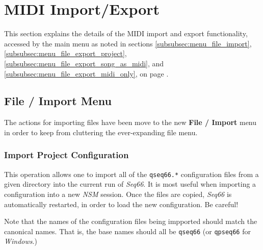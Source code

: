 %
%
%

\section{MIDI Import/Export}
\label{sec:midi_import_export}

   This section explains the details of the MIDI import and export
   functionality, accessed by the main menu as noted in sections
   \ref{subsubsec:menu_file_import},
   \ref{subsubsec:menu_file_export_project},
   \ref{subsubsec:menu_file_export_song_as_midi}, and
   \ref{subsubsec:menu_file_export_midi_only}, on page
   \pageref{subsubsec:menu_file_import}.

\subsection{File / Import Menu}
\label{subsec:midi_export_file_import_menu}

   The actions for importing files have been move to the new
   \textbf{File / Import} menu in order to keep from cluttering the
   ever-expanding file menu.

\subsubsection{Import Project Configuration}
\label{subsubsec:midi_export_file_import_project}

   This operation allows one to import all of the \texttt{qseq66.*}
   configuration files from a given directory into the current run of
   \textsl{Seq66}.
   It is most useful when
   importing a configuration into a new \textsl{NSM} session.
   Once the files are copied, \textsl{Seq66} is automatically restarted,
   in order to load the new configuration.  Be careful!

   Note that the names of the configuration files being impported should
   match the canonical names.  That is, the base names should all be
   \texttt{qseq66} (or \texttt{qpseq66} for \textsl{Windows}.)

